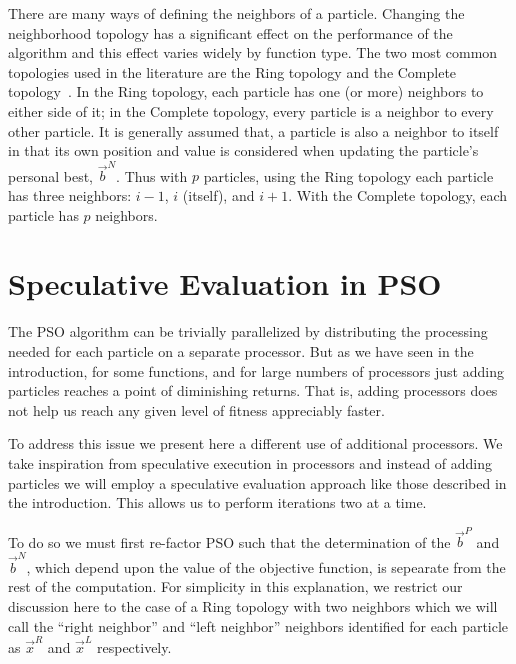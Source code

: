 \documentclass[journal,letterpaper]{IEEEtran}
\providecommand{\pers}{\ensuremath{P}}
\providecommand{\neigh}{\ensuremath{N}}
\providecommand{\leftind}{\ensuremath{L}}
\providecommand{\rightind}{\ensuremath{R}}
\providecommand{\nbest}{\ensuremath{\Vec{b}^\neigh}}
\providecommand{\pbest}{\ensuremath{\Vec{b}^\pers}}
\providecommand{\leftn}{\ensuremath{\Vec{x}^\leftind}}
\providecommand{\rightn}{\ensuremath{\Vec{x}^\rightind}}
\begin{document}
There are many ways of defining the neighbors of a particle. 
Changing the
neighborhood topology has a significant effect on the performance of the algorithm and 
this effect varies widely by function type.
The two most common topologies used in the
literature are the Ring topology and the Complete
topology~\cite{bratton-sis07}.  In the Ring topology, each particle has one
(or more) neighbors to either side of it; in the Complete topology, every particle is a
neighbor to every other particle.  It is generally assumed that, a particle is also a
neighbor to itself in that its own position and value is considered when updating the
particle's personal best, $\nbest$.  Thus with $p$ particles, using the Ring topology each
particle has three neighbors: $i-1$, $i$ (itself), and $i+1$.  With the Complete
topology, each particle has $p$ neighbors.

\section{Speculative Evaluation in PSO}
\label{sec:sepso}

The PSO algorithm can be trivially parallelized by distributing the processing needed for each
particle on a separate processor.
But as we have seen in the introduction, for some
functions, and for large numbers of processors just adding particles
reaches a point of diminishing returns.
That is, adding processors does not help us reach any given level of fitness appreciably faster.

To address this issue we present here a different use of additional processors.
We take inspiration from speculative execution in processors and instead of adding particles
we will employ a speculative evaluation approach like those described in the introduction. 
This allows us to perform iterations two at a time.

To do so we must first re-factor PSO such that the determination of the $\pbest$ and $\nbest$,
which depend upon the value of the objective function, is sepearate from the rest of the computation.
For simplicity in this
explanation, we restrict our discussion here to the case of a Ring topology
with two neighbors which we will call the ``right neighbor'' and ``left
neighbor'' neighbors identified for each particle as $\rightn$ and $\leftn$
respectively.
\end{document}

